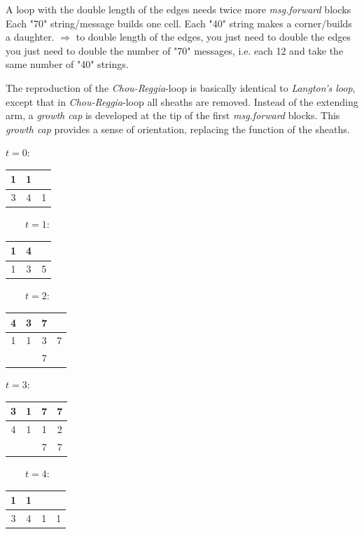 \documentclass[10pt,a4paper,boxed]{hmcpset}
\begin{document}
\begin{problem}[Assignment 24]
\end{problem}
\begin{solution}
    A loop with the double length of the edges needs twice more \emph{msg.forward} blocks
    Each "70" string/message builds one cell. Each "40" string makes a corner/builds a daughter.
    $\Rightarrow$ to double length of the edges, you just need to double the edges you just need to double the number of "70" messages, i.e. each 12 and take the same number of "40" strings.  
\end{solution}

\begin{problem}[Assignment 25]
\end{problem}
\begin{solution}
The reproduction of the \emph{Chou-Reggia}-loop is basically identical to \emph{Langton's loop}, except that in \emph{Chou-Reggia}-loop all sheaths are removed. Instead of the extending arm, a \emph{growth cap} is developed at the tip of the first \emph{msg.forward} blocks. This \emph{growth cap} provides a sense of orientation, replacing the function of the sheaths.

$t=0:$
\begin{tabular}{|c|c|c|}
\cline{1-2} 
1 & 1 & \multicolumn{1}{c}{}\tabularnewline
\hline 
3 & 4 & 1\tabularnewline
\hline 
\end{tabular}%
$\qquad t=1:$
\begin{tabular}{|c|c|c|}
\cline{1-2} 
1 & 4 & \multicolumn{1}{c}{}\tabularnewline
\hline 
1 & 3 & 5\tabularnewline
\hline 
\end{tabular}%
$\qquad t=2:$
\begin{tabular}{|c|c|c|c}
\cline{1-3} 
4 & 3 & 7 & \tabularnewline
\hline 
1 & 1 & 3 & \multicolumn{1}{c|}{7}\tabularnewline
\hline 
\multicolumn{1}{c}{} &  & 7 & \tabularnewline
\cline{3-3} 
\end{tabular}%

$t=3:$
\begin{tabular}{|c|c|c|c|}
\hline 
3 & 1 & 7 & 7\tabularnewline
\hline 
4 & 1 & 1 & 2\tabularnewline
\hline 
\multicolumn{1}{c}{} &  & 7 & 7\tabularnewline
\cline{3-4} 
\end{tabular}%
$\qquad t=4:$
\begin{tabular}{|c|c|c|c|}
\cline{1-2} 
1 & 1 & \multicolumn{1}{c}{} & \multicolumn{1}{c}{}\tabularnewline
\hline 
3 & 4 & 1 & 1\tabularnewline
\hline 
\end{tabular}

\end{solution}
\end{document}
